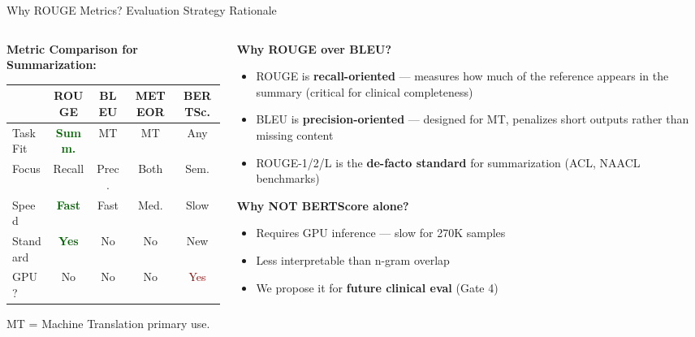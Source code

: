 \documentclass[10pt, aspectratio=169]{beamer}
\begin{document}
\begin{frame}{Why ROUGE Metrics? Evaluation Strategy Rationale}
  \footnotesize
  \begin{columns}[T]
    \begin{column}{0.48\textwidth}
      \textbf{Metric Comparison for Summarization:}
      \begin{table}
        \centering
        \scriptsize
        \renewcommand{\arraystretch}{1.15}
        \begin{tabular}{l|cccc}
          \toprule
          & \textbf{ROUGE} & \textbf{BLEU} & \textbf{METEOR} & \textbf{BERTSc.} \\
          \midrule
          Task Fit & \textcolor{darkgreen}{\textbf{Summ.}} & MT & MT & Any \\
          Focus & Recall & Prec. & Both & Sem. \\
          Speed & \textcolor{darkgreen}{\textbf{Fast}} & Fast & Med. & Slow \\
          Standard & \textcolor{darkgreen}{\textbf{Yes}} & No & No & New \\
          GPU? & No & No & No & \textcolor{darkred}{Yes} \\
          \bottomrule
        \end{tabular}
      \end{table}
      \vspace{-0.1cm}
      {\scriptsize MT = Machine Translation primary use.}
    \end{column}
    \begin{column}{0.48\textwidth}
      \textbf{Why ROUGE over BLEU?}
      \begin{itemize}\setlength{\itemsep}{0pt}
        \item ROUGE is \textbf{recall-oriented} --- measures how much of the reference appears in the summary (critical for clinical completeness)
        \item BLEU is \textbf{precision-oriented} --- designed for MT, penalizes short outputs rather than missing content
        \item ROUGE-1/2/L is the \textbf{de-facto standard} for summarization (ACL, NAACL benchmarks)
      \end{itemize}

      \vspace{0.1cm}
      \textbf{Why NOT BERTScore alone?}
      \begin{itemize}\setlength{\itemsep}{0pt}
        \item Requires GPU inference --- slow for 270K samples
        \item Less interpretable than n-gram overlap
        \item We propose it for \textbf{future clinical eval} (Gate 4)
      \end{itemize}
    \end{column}
  \end{columns}
\end{frame}
\end{document}
